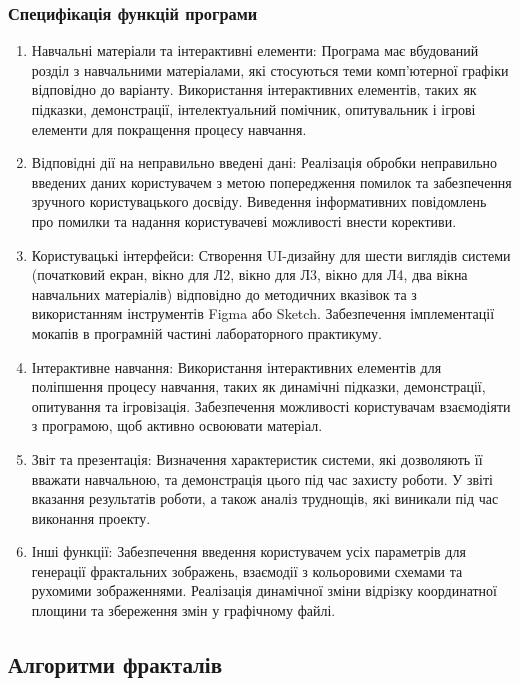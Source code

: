 \documentclass[oneside,14pt]{extarticle}
\begin{document}
\begin{normalsize}
	\subsubsection{Специфікація функцій програми}
	\begin{enumerate}
		\item Навчальні матеріали та інтерактивні елементи:
		Програма має вбудований розділ з навчальними матеріалами, які стосуються теми комп'ютерної графіки відповідно до варіанту.
		Використання інтерактивних елементів, таких як підказки, демонстрації, інтелектуальний помічник, опитувальник і ігрові елементи для покращення процесу навчання.
		\item Відповідні дії на неправильно введені дані:
		Реалізація обробки неправильно введених даних користувачем з метою попередження помилок та забезпечення зручного користувацького досвіду.
		Виведення інформативних повідомлень про помилки та надання користувачеві можливості внести корективи.
		\item Користувацькі інтерфейси:
		Створення UI-дизайну для шести виглядів системи (початковий екран, вікно для Л2, вікно для Л3, вікно для Л4, два вікна навчальних матеріалів) відповідно до методичних вказівок та з використанням інструментів Figma або Sketch.
		Забезпечення імплементації мокапів в програмній частині лабораторного практикуму.
		\item Інтерактивне навчання:
		Використання інтерактивних елементів для поліпшення процесу навчання, таких як динамічні підказки, демонстрації, опитування та ігровізація.
		Забезпечення можливості користувачам взаємодіяти з програмою, щоб активно освоювати матеріал.
		\item Звіт та презентація:
		Визначення характеристик системи, які дозволяють її вважати навчальною, та демонстрація цього під час захисту роботи.
		У звіті вказання результатів роботи, а також аналіз труднощів, які виникали під час виконання проекту.
		\item Інші функції:
		Забезпечення введення користувачем усіх параметрів для генерації фрактальних зображень, взаємодії з кольоровими схемами та рухомими зображеннями.
		Реалізація динамічної зміни відрізку координатної площини та збереження змін у графічному файлі.
	\end{enumerate}
	
	\subsection{Алгоритми фракталів}

\end{normalsize}
\end{document}

